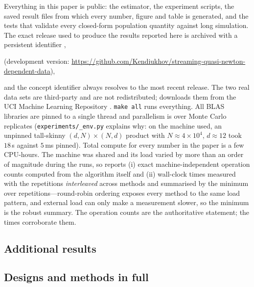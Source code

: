 Everything in this paper is public: the estimator, the experiment scripts, the saved result files
from which every number, figure and table is generated, and the tests that validate every
closed-form population quantity against long simulation. The exact release used to produce the
results reported here is archived with a persistent identifier
\citep{kendiukhov2026bgsn},
\begin{center}
\quad(development version:
\url{https://github.com/Kendiukhov/streaming-quasi-newton-dependent-data}),
\end{center}
and the concept identifier  always resolves to the most recent
release.
The two real data sets are third-party and are not redistributed; 
downloads them from the UCI Machine Learning Repository
\citep{hogue2019metro,chen2019beijingairuci,kellyuci}.
\texttt{make all} runs everything. All BLAS libraries are pinned to a single thread and
parallelism is over Monte Carlo replicates (\texttt{experiments/\_env.py} explains why: on the
machine used, an unpinned tall-skinny $(d,N)\times(N,d)$ product with $N\approx4\times10^4$,
$d\approx12$ took $18$\,s against $5$\,ms pinned). Total compute for every number in the paper
is a few CPU-hours. The machine was shared and its load varied by more than an order of
magnitude during the runs, so  reports (i) exact machine-independent operation
counts computed from the algorithm itself and (ii) wall-clock times measured with the
repetitions \emph{interleaved} across methods and summarised by the minimum over
repetitions---round-robin ordering exposes every method to the same load pattern, and external
load can only make a measurement slower, so the minimum is the robust summary. The operation
counts are the authoritative statement; the times corroborate them.

\subsection{Additional results}
\label{app:extra}

\subsection{Designs and methods in full}
\label{app:methods}

